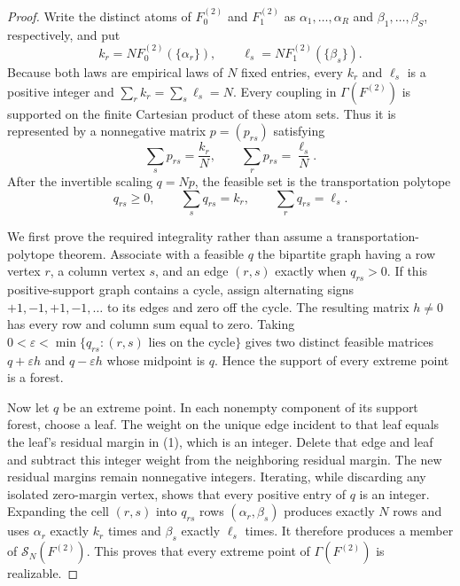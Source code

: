 \documentclass{article}
\begin{document}
\begin{proof}
Write the distinct atoms of \(F_0^{(2)}\) and \(F_1^{(2)}\) as \(\alpha_1,\ldots,\alpha_R\) and \(\beta_1,\ldots,\beta_S\), respectively, and put
\[
k_r=NF_0^{(2)}(\{\alpha_r\}),\qquad
\ell_s=NF_1^{(2)}(\{\beta_s\}).
\]
Because both laws are empirical laws of \(N\) fixed entries, every \(k_r\) and \(\ell_s\) is a positive integer and
\(\sum_r k_r=\sum_s\ell_s=N\).  Every coupling in \(\Gamma(F^{(2)})\) is supported on the finite Cartesian product of these atom sets.  Thus it is represented by a nonnegative matrix \(p=(p_{rs})\) satisfying
\[
\sum_s p_{rs}=\frac{k_r}{N},\qquad
\sum_r p_{rs}=\frac{\ell_s}{N}.
\]
After the invertible scaling \(q=Np\), the feasible set is the transportation polytope
\[
q_{rs}\geq 0,\qquad \sum_s q_{rs}=k_r,\qquad \sum_r q_{rs}=\ell_s. \tag{1}
\]

We first prove the required integrality rather than assume a transportation-polytope theorem.  Associate with a feasible \(q\) the bipartite graph having a row vertex \(r\), a column vertex \(s\), and an edge \((r,s)\) exactly when \(q_{rs}>0\).  If this positive-support graph contains a cycle, assign alternating signs \(+1,-1,+1,-1,\ldots\) to its edges and zero off the cycle.  The resulting matrix \(h\neq0\) has every row and column sum equal to zero.  Taking
\(0<\varepsilon<\min\{q_{rs}:(r,s)\text{ lies on the cycle}\}\) gives two distinct feasible matrices \(q+\varepsilon h\) and \(q-\varepsilon h\) whose midpoint is \(q\).  Hence the support of every extreme point is a forest.

Now let \(q\) be an extreme point.  In each nonempty component of its support forest, choose a leaf.  The weight on the unique edge incident to that leaf equals the leaf's residual margin in (1), which is an integer.  Delete that edge and leaf and subtract this integer weight from the neighboring residual margin.  The new residual margins remain nonnegative integers.  Iterating, while discarding any isolated zero-margin vertex, shows that every positive entry of \(q\) is an integer.  Expanding the cell \((r,s)\) into \(q_{rs}\) rows \((\alpha_r,\beta_s)\) produces exactly \(N\) rows and uses \(\alpha_r\) exactly \(k_r\) times and \(\beta_s\) exactly \(\ell_s\) times.  It therefore produces a member of \(\mathcal S_N(F^{(2)})\).  This proves that every extreme point of \(\Gamma(F^{(2)})\) is realizable.


\end{proof}
\end{document}
